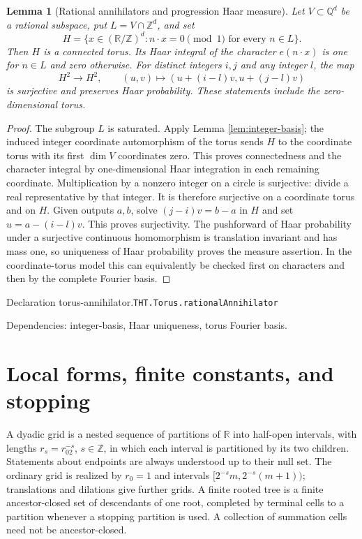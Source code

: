 \documentclass[11pt]{article}
\newtheorem{lemma}[theorem]{Lemma}
\theoremstyle{definition}
\newcommand{\R}{\mathbb R}
\newcommand{\Z}{\mathbb Z}
\newcommand{\Q}{\mathbb Q}
\numberwithin{equation}{section}
\newcommand{\bp}[3]{\par\smallskip\begingroup\footnotesize
\noindent\hypertarget{bp:#1}{\textsf{Declaration #1.}}\quad\nolinkurl{#2}\par
\noindent\textsf{Dependencies:} #3.\par\endgroup\smallskip}
\begin{document}
\begin{lemma}[Rational annihilators and progression Haar measure]\label{lem:torus-annihilator}
Let $V\subset\Q^d$ be a rational subspace, put $L=V\cap\Z^d$, and set
\[
 H=\{x\in(\R/\Z)^d:n\cdot x=0\pmod1\text{ for every }n\in L\}.
\]
Then $H$ is a connected torus. Its Haar integral of the character $e(n\cdot x)$ is one for $n\in L$ and zero otherwise. For distinct integers $i,j$ and any integer $l$, the map
\[
 H^2\longrightarrow H^2,\qquad (u,v)\longmapsto(u+(i-l)v,u+(j-l)v)
\]
is surjective and preserves Haar probability. These statements include the zero-dimensional torus.
\end{lemma}
\begin{proof}
The subgroup $L$ is saturated. Apply Lemma \ref{lem:integer-basis}; the induced integer coordinate automorphism of the torus sends $H$ to the coordinate torus with its first $\dim V$ coordinates zero. This proves connectedness and the character integral by one-dimensional Haar integration in each remaining coordinate. Multiplication by a nonzero integer on a circle is surjective: divide a real representative by that integer. It is therefore surjective on a coordinate torus and on $H$. Given outputs $a,b$, solve $(j-i)v=b-a$ in $H$ and set $u=a-(i-l)v$. This proves surjectivity. The pushforward of Haar probability under a surjective continuous homomorphism is translation invariant and has mass one, so uniqueness of Haar probability proves the measure assertion. In the coordinate-torus model this can equivalently be checked first on characters and then by the complete Fourier basis.
\end{proof}
\bp{torus-annihilator}{THT.Torus.rationalAnnihilator}{integer-basis, Haar uniqueness, torus Fourier basis}


\section{Local forms, finite constants, and stopping}\label{sec:reduction}
A dyadic grid is a nested sequence of partitions of $\R$ into half-open intervals, with lengths $r_s=r_02^{-s}$, $s\in\Z$, in which each interval is partitioned by its two children. Statements about endpoints are always understood up to their null set. The ordinary grid is realized by $r_0=1$ and intervals $[2^{-s}m,2^{-s}(m+1))$; translations and dilations give further grids. A finite rooted tree is a finite ancestor-closed set of descendants of one root, completed by terminal cells to a partition whenever a stopping partition is used. A collection of summation cells need not be ancestor-closed.
\end{document}
